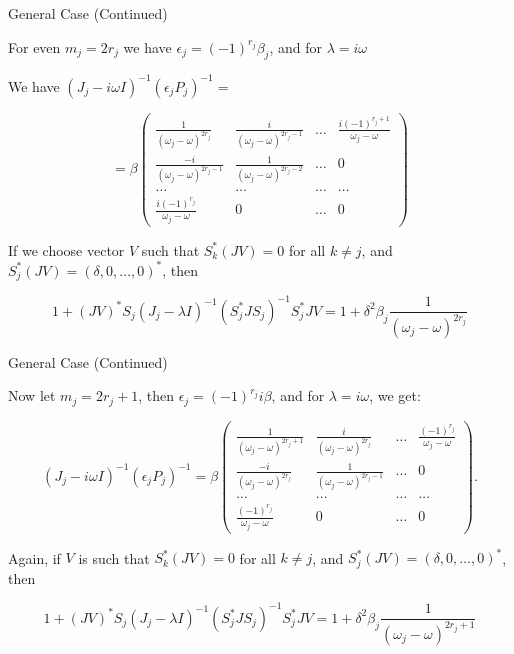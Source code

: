 \begin{frame}{General Case (Continued)}


For even $m_{j}=2r_{j}$ we have $\epsilon_{j}=(-1)^{r_{j}}\beta_{j}$, and for $\lambda = i\omega$



We have $(J_{j}-i\omega I)^{-1}(\epsilon_{j}P_{j})^{-1}=$    

$$= 
\beta \left(\begin{array}{cccc}
\frac{1}{(\omega_{j}-\omega)^{2r_{j}}} & 
\frac{i}{(\omega_{j}-\omega)^{2r_{j}-1}} & \ldots & \frac{i(-1)^{r_{j}+1}}{\omega_{j}-\omega} \\ 
\frac{-i}{(\omega_{j}-\omega)^{2r_{j}-1}} & 
\frac{1}{(\omega_{j}-\omega)^{2r_{j}-2}} & \ldots & 0 \\
\ldots & \ldots & \ldots & \ldots  \\
\frac{i(-1)^{r_{j}}}{\omega_{j}-\omega} & 0 & \ldots & 0 \end{array}\right)
$$


If we choose vector $V$ such that $S_{k}^{*}(JV)=0$ for all $k\ne j$, and $S_{j}^{*}(JV)=(\delta,0,\ldots,0)^{*}$, then 

$$ 1+(JV)^{*}S_{j}(J_{j}-\lambda I)^{-1}(S_{j}^{*}JS_{j})^{-1}S_{j}^{*}JV = 
1+\delta^{2}\beta_{j} \frac{1}{(\omega_{j}-\omega)^{2r_{j}}}
$$

\end{frame}


\begin{frame}{General Case (Continued)}

\begin{block}{}
Now let $m_{j}=2r_{j}+1$, then $\epsilon_{j}=(-1)^{r_{j}}i\beta$, and for $\lambda=i\omega$, we get:
\end{block}

$$ (J_{j}-i\omega I)^{-1}(\epsilon_{j}P_{j})^{-1} = 
\beta \left(\begin{array}{cccc}
\frac{1}{(\omega_{j}-\omega)^{2r_{j}+1}} & 
\frac{i}{(\omega_{j}-\omega)^{2r_{j}}} & \ldots & \frac{(-1)^{r_{j}}}{\omega_{j}-\omega} \\ 
\frac{-i}{(\omega_{j}-\omega)^{2r_{j}}} & 
\frac{1}{(\omega_{j}-\omega)^{2r_{j}-1}} & \ldots & 0 \\
\ldots & \ldots & \ldots & \ldots  \\
\frac{(-1)^{r_{j}}}{\omega_{j}-\omega} & 0 & \ldots & 0 \end{array}\right).
$$

Again, if $V$ is such that $S_{k}^{*}(JV)=0$ for all $k\ne j$, and $S_{j}^{*}(JV)=(\delta,0,\ldots,0)^{*}$, then 

$$ 1+(JV)^{*}S_{j}(J_{j}-\lambda I)^{-1}(S_{j}^{*}JS_{j})^{-1}S_{j}^{*}JV = 
1+\delta^{2}\beta_{j} \frac{1}{(\omega_{j}-\omega)^{2r_{j}+1}}
$$

\end{frame}


